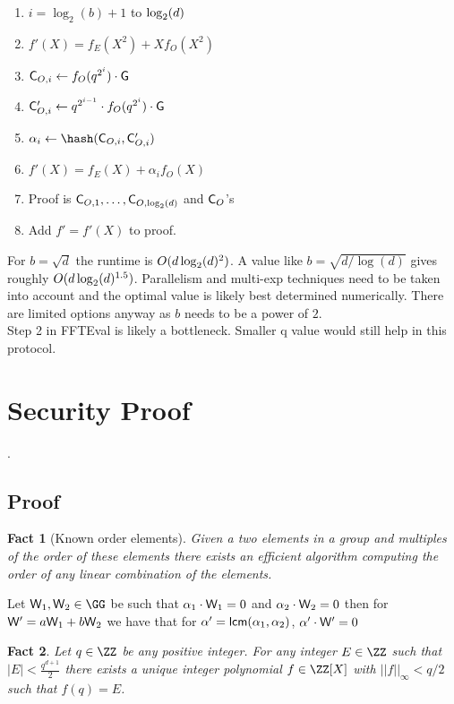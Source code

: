\documentclass{article}
\theoremstyle{Definition}
\newtheorem{fact}{Fact}
\begin{document}
\begin{mdframed}
\begin{enumerate}[nolistsep]
		\item \pcfor $i=\log_2(b)+1$ to $\log_2(d)$
		\item \pcind[1] $f'(X)=f_E(X^2)+Xf_O(X^2)$
		\item \pcind[1] $\mathsf{C}_{O,i}\gets f_O(q^{2^i}) \cdot \mathsf{G}$ 
		\item  \pcind[1] $\mathsf{C}_{O,i}'\gets q^{2^{i-1}} \cdot f_O(q^{2^i}) \cdot \mathsf{G}$ 
		\item \pcind[1] $\alpha_i\gets\hash(\gr{C}_{O,i},\gr{C}_{O,i}')$
		\item \pcind[1] $f'(X)=f_E(X)+\alpha_i f_O(X)$
		\item Proof is $\mathsf{C}_{O,1},\dots,\mathsf{C}_{O,\log_2(d)}$ and $\mathsf{C}_O$'s
		\item Add $f'=f'(X)$ to proof.
	\end{enumerate}
	\end{mdframed}
	For $b=\sqrt{d}$ the runtime is $O(d \log_2(d)^2)$. A value like $b=\sqrt{d/\log(d)}$ gives roughly $O(d\log_2(d)^{1.5})$. Parallelism and multi-exp techniques need to be taken into account and the optimal value is likely best determined numerically. There are limited options anyway as $b$ needs to be a power of $2$.\\ 
Step 2 in FFTEval is likely a bottleneck. Smaller q value would still help in this protocol.
\section{Security Proof}

.

\subsection{Proof}

\begin{fact}[Known order elements]
	\label{fact:knownorder}
	Given a two elements in a group and multiples of the order of these elements there exists an efficient algorithm computing the order of any linear combination of the elements.
\end{fact}
Let $\gr{W}_1,\gr{W}_2 \in \GG$ be such that $\alpha_1 \cdot \mathsf{W}_1=0$ and $\alpha_2 \cdot \mathsf{W}_2=0$ then for $\mathsf{W}'=a\mathsf{W}_1 + b \mathsf{W}_2$ we have that for $\alpha'=\mathsf{lcm}(\alpha_1,\alpha_2)$, $\alpha' \cdot \mathsf{W}'=0$
\begin{fact}
\label{fact:encoding}
Let $q \in \ZZ$ be any positive integer. For any integer $E \in \ZZ$ such that $|E|<\frac{q^{d+1}}{2}$ there exists a unique integer polynomial $f \in \ZZ[X]$ with $||f||_\infty < q/2$ such that $f(q) = E$. 
\end{fact} 
\end{document}
